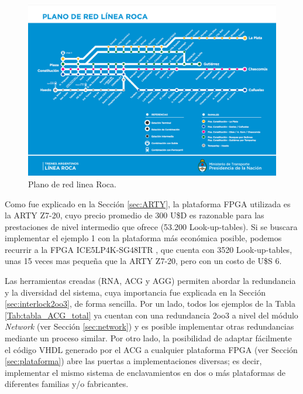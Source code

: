 	 \begin{figure}[H]
	 	\centering
	 	\includegraphics[origin = c, width=1\textwidth]{resultados-obtenidos/ejemplo1/images/mapa-linea-roca}
	 	\centering\caption{Plano de red linea Roca.}
	 	\label{fig:ROCA}
	 \end{figure}
	 
	 Como fue explicado en la Sección \ref{sec:ARTY}, la plataforma FPGA utilizada es la ARTY Z7-20, cuyo precio promedio de 300 U\$D es razonable para las prestaciones de nivel intermedio que ofrece (53.200 Look-up-tables). Si se buscara implementar el ejemplo 1 con la plataforma más económica posible, podemos recurrir a la FPGA ICE5LP4K-SG48ITR \cite{LATTICE}, que cuenta con 3520 Look-up-tables, unas 15 veces mas pequeña que la ARTY Z7-20, pero con un costo de U\$S 6.
	 
	 
	 Las herramientas creadas (RNA, ACG y AGG) permiten abordar la redundancia y la diversidad del sistema, cuya importancia fue explicada en la Sección \ref{sec:interlock2oo3}, de forma sencilla. Por un lado, todos los ejemplos de la Tabla \ref{Tab:tabla_ACG_total} ya cuentan con una redundancia 2oo3 a nivel del módulo \textit{Network} (ver Sección \ref{sec:network}) y es posible implementar otras redundancias mediante un proceso similar. Por otro lado, la posibilidad de adaptar fácilmente el código VHDL generado por el ACG a cualquier plataforma FPGA (ver Sección \ref{sec:plataforma}) abre las puertas a implementaciones diversas; es decir, implementar el mismo sistema de enclavamientos en dos o más plataformas de diferentes familias y/o fabricantes.
	 
	 
	 
	 
	 
	 
	 
	